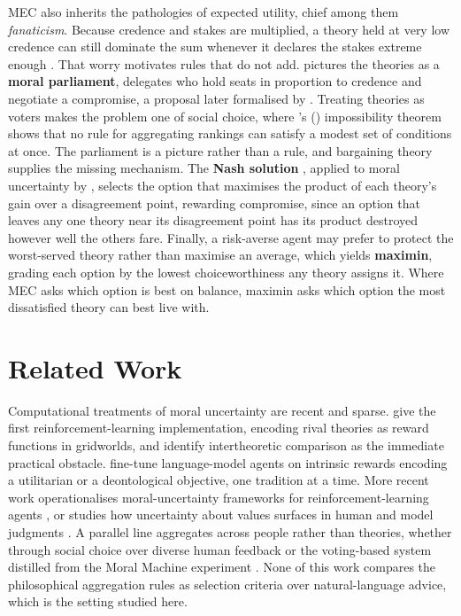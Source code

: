 \documentclass[10pt,twocolumn,a4paper]{article}
\let\cite\citep
\begin{document}
MEC also inherits the pathologies of expected utility, chief among them
\emph{fanaticism}. Because credence and stakes are multiplied, a theory
held at very low credence can still dominate the sum whenever it
declares the stakes extreme enough \cite{macaskill2020}. That worry
motivates rules that do not add. \citet{bostrom2009} pictures the
theories as a \textbf{moral parliament}, delegates who hold seats in
proportion to credence and negotiate a compromise, a proposal later
formalised by \citet{newberry2021}. Treating theories as voters makes
the problem one of social choice, where \citeauthor{arrow1951}'s
(\citeyear{arrow1951}) impossibility theorem shows that no rule for
aggregating rankings can satisfy a modest set of conditions at once. The
parliament is a picture rather
than a rule, and bargaining theory supplies the missing mechanism. The
\textbf{Nash solution} \cite{nash1950}, applied to moral uncertainty by
\citet{greaves2019}, selects the option that maximises the product of
each theory's gain over a disagreement point, rewarding compromise,
since an option that leaves any one theory near its disagreement point
has its product destroyed however well the others fare. Finally, a
risk-averse agent may prefer to protect the worst-served
theory rather than maximise an average, which yields \textbf{maximin},
grading each option by the lowest choiceworthiness any theory assigns
it. Where MEC asks which option is best on balance, maximin asks which
option the most dissatisfied theory can best live with.

\section{Related Work}
\label{sec:related}


Computational treatments of moral uncertainty are recent and sparse.
\citet{ecoffet2021} give the first reinforcement-learning
implementation, encoding rival theories as reward functions in
gridworlds, and identify intertheoretic comparison as the immediate
practical obstacle. \citet{tennant2024} fine-tune language-model agents
on intrinsic rewards encoding a utilitarian or a deontological
objective, one tradition at a time. More recent work operationalises
moral-uncertainty frameworks for reinforcement-learning agents \cite{dubey2025},
or studies how uncertainty about values surfaces in human and model
judgments \cite{kwon2025}. A parallel line aggregates across people
rather than theories, whether through social choice over diverse human
feedback \cite{conitzer2024} or the voting-based system distilled from
the Moral Machine experiment \cite{awad2018,noothigattu2018}. None of
this work compares the philosophical aggregation rules as selection
criteria over natural-language advice, which is the setting studied
here.
\end{document}
